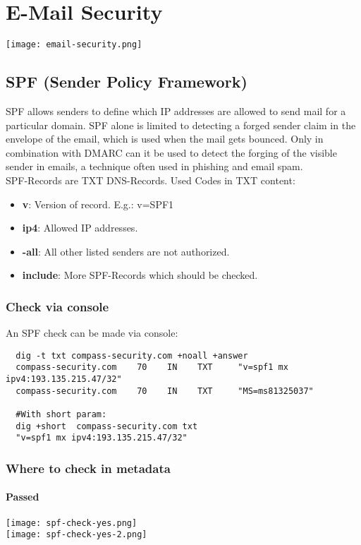 \section{E-Mail Security}
\texttt{[image: email-security.png]}



\subsection{SPF (Sender Policy Framework)}
SPF allows senders to define which IP addresses are allowed to send mail for a particular domain. SPF alone is limited to detecting a forged sender claim in the envelope of the email, which is used when the mail gets bounced.
Only in combination with DMARC can it be used to detect the forging of the visible sender in emails, a technique often used in phishing and email spam.\\

SPF-Records are TXT DNS-Records. Used Codes in TXT content:
\begin{itemize}
  \item \textbf{v}: Version of record. E.g.: v=SPF1
  \item \textbf{ip4}: Allowed IP addresses.
  \item \textbf{-all}: All other listed senders are not authorized.
  \item \textbf{include}: More SPF-Records which should be checked.
\end{itemize}

\subsubsection{Check via console}
An SPF check can be made via console:
\begin{lstlisting}
  dig -t txt compass-security.com +noall +answer
  compass-security.com    70    IN    TXT     "v=spf1 mx ipv4:193.135.215.47/32"
  compass-security.com    70    IN    TXT     "MS=ms81325037"

  #With short param:
  dig +short  compass-security.com txt
  "v=spf1 mx ipv4:193.135.215.47/32"
\end{lstlisting}

\subsubsection{Where to check in metadata}
\paragraph{Passed}
\texttt{[image: spf-check-yes.png]}\\
\texttt{[image: spf-check-yes-2.png]}

